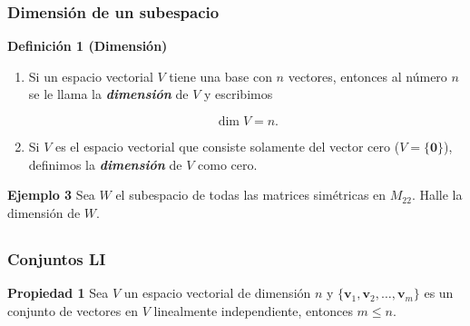 \begin{frame}\frametitle{Dimensión de un subespacio}

\begin{block}{\textbf{Definición 1 (Dimensión)}}
	\justifying
	\begin{enumerate}
		\item[\labelname{$a$}] Si un espacio vectorial $V$ tiene una base con $n$ vectores, entonces al número $n$ se le llama la
		\textbf{\textit{dimensión}} de $V$ y escribimos
		
		\vspace{-2mm}
		\[
		\dim V = n.
		\]
		
		\vspace{-1mm}
		\item[\labelname{$b$}] Si $V$ es el espacio vectorial que consiste solamente del vector cero ($V=\{\mathbf{0}\}$), definimos
		la \textbf{\textit{dimensión}} de $V$ como cero.
	\end{enumerate}		
\end{block}


\begin{ej}{\textbf{Ejemplo 3 }} \justifying
	Sea $W$ el subespacio de todas las matrices simétricas en $M_{22}$. Halle la dimensión de $W$.
	
\end{ej}	

\end{frame}


\subsection{}

\begin{frame}\frametitle{Conjuntos LI}
	
	\begin{prop}{\textbf{Propiedad 1}}\justifying
		Sea $V$ un espacio vectorial de dimensión $n$ y $\{\mathbf{v}_1, \mathbf{v}_2, \hdots , \mathbf{v}_m \}$ es un conjunto de vectores en $V$ linealmente independiente, entonces $m\leq n$.
	\end{prop}	
	
	
\end{frame}


